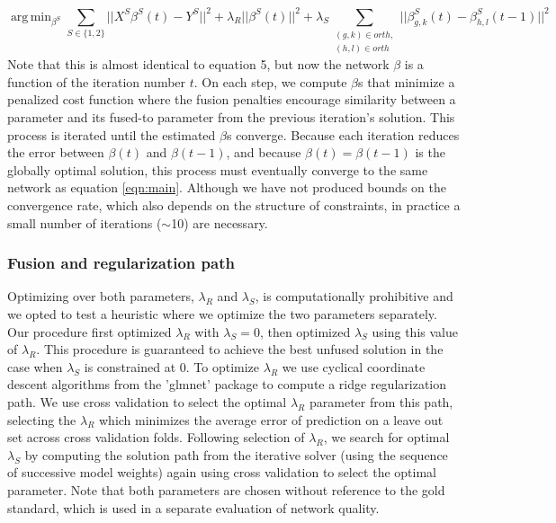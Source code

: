 \documentclass[11pt]{article}
\DeclareMathOperator*{\argmin}{arg\,min}
\begin{document}
\begin{equation}
\argmin_{\beta^S} \displaystyle\sum_{S \in \{1, 2\}} ||X^{S}\beta^{S}(t) - Y^{S}||^2 + \lambda_R||\beta^{S}(t)||^2 + \lambda_S\displaystyle \sum_{\substack{(g,k) \in orth,\\
 (h,l) \in orth}} ||\beta^{S}_{g,k}(t) - \beta_{h,l}^{S}(t-1)||^2
\end{equation}
Note that this is almost identical to equation 5, but now the network $\beta$ is a function of the iteration number $t$. On each step, we compute $\beta$s that minimize a penalized cost function where the fusion penalties encourage similarity between a parameter and its fused-to parameter from the previous iteration's solution. 
This process is iterated until the estimated $\beta$s converge. 
Because each iteration reduces the error between $\beta(t)$ and $\beta(t-1)$, and because $\beta(t) = \beta(t-1)$ is the globally optimal solution, this process must eventually converge to the same network as equation \ref{eqn:main}. 
Although we have not produced bounds on the convergence rate, which also depends on the structure of constraints, in practice a small number of iterations ($\sim$10) are necessary.


\subsubsection{Fusion and regularization path}
Optimizing over both parameters, $\lambda_R$ and $\lambda_S$, is computationally prohibitive and we opted to test a heuristic where we optimize the two parameters separately. 
Our procedure first optimized $\lambda_R$ with $\lambda_S=0$, then optimized $\lambda_S$ using this value of $\lambda_R$. 
This procedure is guaranteed to achieve the best unfused solution in the case when $\lambda_S$ is constrained at 0. 
To optimize $\lambda_R$ we use cyclical coordinate descent algorithms from the 'glmnet' package \cite{friedman_regularization_2010} to compute a ridge regularization path. 
We use cross validation to select the optimal $\lambda_R$ parameter from this path, selecting the $\lambda_R$ which minimizes the average error of prediction on a leave out set across cross validation folds. 
Following selection of $\lambda_R$, we search for optimal $\lambda_S$ by computing the solution path from the iterative solver (using the sequence of successive model weights) again using cross validation to select the optimal parameter. 
Note that both parameters are chosen without reference to the gold standard, which is used in a separate evaluation of network quality. 
\end{document}
